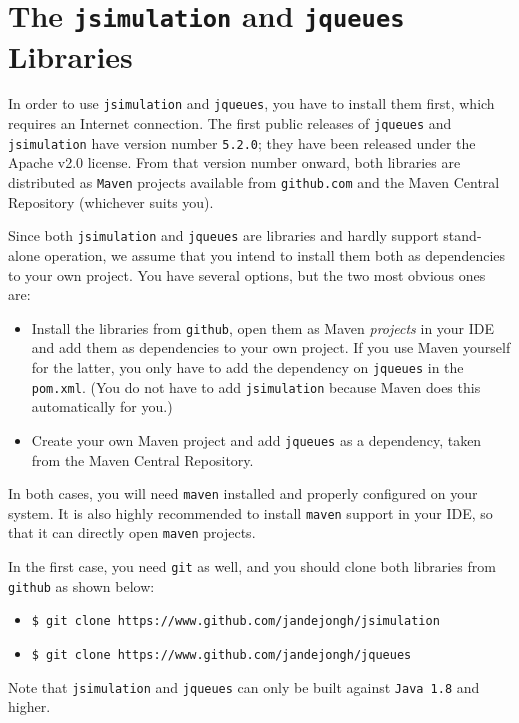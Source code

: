 \section{The \texttt{jsimulation} and \texttt{jqueues} Libraries}

In order to use \lstinline|jsimulation|
  and \lstinline|jqueues|, you have to install
  them first,
  which requires an Internet connection.
The first public releases of \lstinline|jqueues| and
  \lstinline|jsimulation| have version number \lstinline|5.2.0|;
  they have been released under the Apache v2.0 license.
From that version number onward,
  both libraries are distributed as \lstinline|Maven|
  projects
  available from \lstinline|github.com|
  and the Maven Central Repository
  (whichever suits you).
  
Since both \lstinline|jsimulation|
  and \lstinline|jqueues| are libraries
  and hardly support stand-alone operation,
  we assume that you intend to install
  them both as dependencies to your own project.
You have several options, but the two most obvious ones are:
\begin{itemize}
	\item Install the libraries from \lstinline|github|,
	        open them as Maven {\em projects\/} in your IDE
	        and add them as dependencies to your own project.
	      If you use Maven yourself for the latter,
	        you only have to add
	        the dependency on \lstinline|jqueues| in the
	        \lstinline|pom.xml|.
	      (You do not have to add \lstinline|jsimulation|
            because Maven does this automatically for you.)
	\item Create your own Maven project and add
	        \lstinline|jqueues| as a dependency,
	        taken from the Maven Central Repository.
\end{itemize}
In both cases,
  you will need \lstinline|maven| installed and properly configured on your system.
It is also highly recommended to install
  \lstinline|maven| support in your IDE,
  so that it can directly open \lstinline|maven| projects.

In the first case, you need \lstinline|git| as well,
  and you should clone both libraries
  from \lstinline|github| as shown below:
\begin{itemize}
	\item \lstinline|$ git clone https://www.github.com/jandejongh/jsimulation|
	\item \lstinline|$ git clone https://www.github.com/jandejongh/jqueues|
\end{itemize}
Note that \lstinline|jsimulation| and \lstinline|jqueues|
  can only be built against \lstinline|Java 1.8| and higher.

